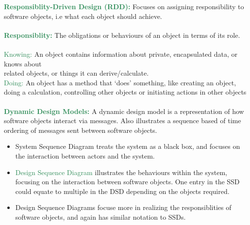 \documentclass[a4paper,10pt]{article}
\begin{document}
\noindent \textcolor{SeaGreen}{\textbf{Responsiblity-Driven Design (RDD):}} Focuses on assigning responsibility to software objects, i.e what each object should achieve.\\\\
\textcolor{SeaGreen}{\textbf{Responsiblity:}} The obligations or behaviours of an object in terms of its role.\\\\
\indent \textcolor{SeaGreen}{Knowing:} An object contains information about private, encapsulated data, or knows about \\
\indent related objects, or things it can derive/calculate. \\
\indent \textcolor{SeaGreen}{Doing:} An object has a method that `does' something, like creating an object, doing a calculation, \indent controlling other objects or initiating actions in other objects \\ \\
\textcolor{SeaGreen}{\textbf{Dynamic Design Models:}} A dynamic design model is a representation of how software objects interact via messages. Also illustrates a sequence based of time ordering of messages sent between software objects.
\renewcommand{\labelitemi}{\textperiodcentered}
\begin{itemize}
\item \textcolor{Emerald}{System Sequence Diagram} treats the system as a black box, and focuses on the interaction between actors and the system.
\item \textcolor{SeaGreen}{Design Sequence Diagram} illustrates the behaviours within the system, focusing on the interaction between software objects. One entry in the SSD could equate to multiple in the DSD depending on the objects required. 
\item Design Sequence Diagrams focuse more in realizing the responsiblities of software objects, and again has similar notation to SSDs. 
\end{itemize}

\newpage 
\end{document}
